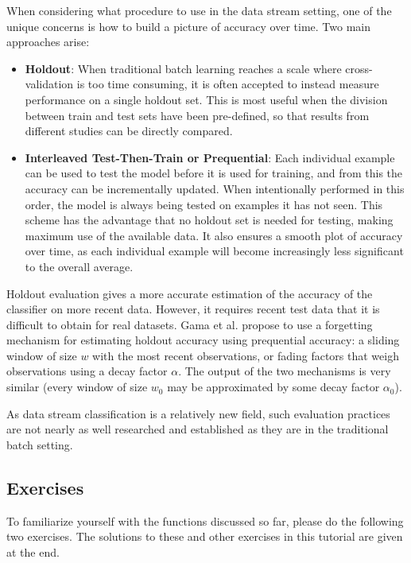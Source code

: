 \documentclass[a4paper,12pt]{article}
\begin{document}
    When considering what procedure to use in the data stream setting, one of
the unique concerns is how to build a picture of accuracy over time. Two main
approaches arise:
\begin{itemize}
 \item {\bf Holdout}:
When traditional batch learning reaches a scale where cross-validation is too time 
consuming, it is often accepted to instead measure performance on a single holdout
set. This is most useful when the division between train and test sets have
been pre-defined, so that results from different studies can be directly compared. 
\item {\bf Interleaved Test-Then-Train or Prequential}:
 Each individual example can be used to test the model
before it is used for training, and from this the accuracy can be incrementally
updated. When intentionally performed in this order, the model is always
being tested on examples it has not seen. This scheme has the advantage that
no holdout set is needed for testing, making maximum use of the available
data. It also ensures a smooth plot of accuracy over time, as each individual
example will become increasingly less significant to the overall average.
\end{itemize}
   
Holdout evaluation gives a more accurate estimation of the accuracy of the classifier on more recent data. However, it requires recent test data that it is difficult to obtain for real datasets.
Gama et al. 
propose to use a forgetting mechanism for estimating holdout accuracy using
prequential
accuracy: a sliding window of size $w$ with the most recent
observations, or fading factors that weigh observations using a decay
factor $\alpha$. 
The output of the two mechanisms is very
similar (every window of size $w_0$ may be approximated by some decay
factor $\alpha_0$).

As data stream classification is a relatively new field, such evaluation 
practices are not nearly as well researched and established as they are
in the traditional batch setting. 


\subsection{Exercises}

To familiarize yourself with the functions discussed so far, please do the following
two exercises. The solutions to these and other exercises in this tutorial are given
at the end.
\end{document}
